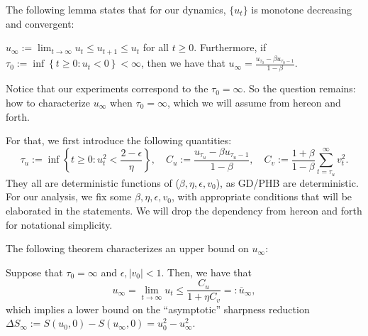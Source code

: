 The following lemma states that for our dynamics, $\{u_t\}$ is monotone decreasing and convergent:
\begin{lemma}
\label{lem:u}
    $u_\infty := \lim_{t \rightarrow \infty} u_t \leq u_{t+1} \leq u_t$ for all $t \geq 0$.
    Furthermore, if $\tau_0 := \inf\left\{ t \geq 0 : u_t < 0 \right\} < \infty$, then we have that $u_\infty = \frac{u_{\tau_0} - \beta u_{\tau_0 - 1}}{1 - \beta}$.
\end{lemma}
Notice that our experiments correspond to the $\tau_0 = \infty$. So the question remains: how to characterize $u_\infty$ when $\tau_0 = \infty$, which we will assume from hereon and forth.

For that, we first introduce the following quantities:
\begin{equation}
\label{eq:CuCv}
    \tau_u := \inf\left\{ t \geq 0 : u_t^2 < \frac{2 - \epsilon}{\eta} \right\}, \quad
    C_u := \frac{u_{\tau_u} - \beta u_{\tau_u - 1}}{1-\beta},\quad
    C_v := \frac{1+\beta}{1-\beta}\sum_{t = \tau_u}^\infty v_t^2.
\end{equation}
They all are deterministic functions of ($\beta, \eta, \epsilon, v_0$), as GD/PHB are deterministic.
For our analysis, we fix some $\beta, \eta, \epsilon, v_0$, with appropriate conditions that will be elaborated in the statements.
We will drop the dependency from hereon and forth for notational simplicity.

The following theorem characterizes an upper bound on $u_\infty$:
\begin{theorem}
\label{thm:toy}
Suppose that $\tau_0 = \infty$ and $\epsilon, |v_0| < 1$.
Then, we have that
\begin{equation}
\label{eq:uinfub}
    u_\infty = \lim_{t \rightarrow \infty} u_t \leq 
    \frac{C_u}{1 + \eta C_v}
    =: 
    \overline{u}_\infty ,
\end{equation}
which implies a lower bound on the ``asymptotic'' sharpness reduction $\Delta S_\infty := S(u_0, 0) - S(u_\infty, 0) = u_0^2 - u_\infty^2$.
\end{theorem}

